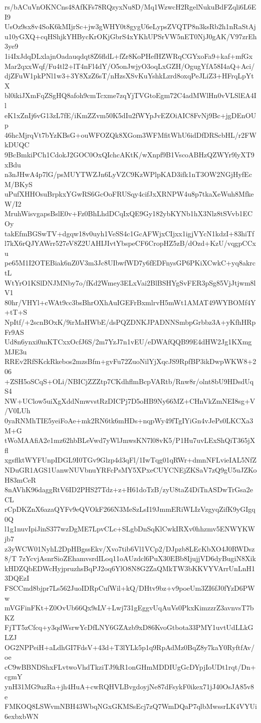 rs/bACuVnOKNCns48AfKFs78RQzyxNu8D/Mq1WzwcH2RgelNukuBdFZqli6L6EI9
UsOz9sx8v4SoK6kMIjrSc+jw3gWHY0t8gygU6eLypsZVQTP8n3ksRb2h1nRaStAj
u10yGXQ+cqHShjkYHBycKrOKjGbrS4xYKhUPSrVW5nET0NjJ0gAK/V97zrEh3ye9
1i4IxJdqDLxlajnOadauqdqt8Z6fldL+fZr8KoPHefHZWRqCGYxoFa9+kaf+mfGx
Mar2qxxWqf/Fu4tl2+lT4nFl4dY/O5onJwjyO3oqLxGZH/OgugYfA58I4aQ+Aci/
djZFuW1pkPNl1w3+3Y8XzZ6sT/nHzsXSvKuYshkLzrd8oxqPeJLiZ3+HFrqLpYtX
bl0ikiJXmFqZSgHQ8afoh9cmTcxme7zqYjTVGtoEgm72C4adMWlHn0vVLSlEA4Il
eK1xZnIj6vG13zL7fE/iKmZZvm50K5dIu2fWYpJvEZOiAIC8FvNj9Bc+jgDEnOUp
46hcMjrqVt7bYzKBsG+ouWFOZQk8XGom3WFMfitWhU6idDfDRScbHL/r2FWkDUQC
9BcBmkiPCh1CdokJ2GOC0OxQIchcAKtK/wXnpf9B1VscoABHzQZWYr9lyXT9xBdu
n3nJHwA4p7lG/psMUYTWZJn6LyVZC9KzWPlpKAD3ifk1nT3OW2NGjHyfEcM/BKyS
uPufXHHOsuBrpkxYGwRS6GcOoFRUSqy4cifJxXRNPW4u8p7tkaXeWuh8MfkeW/I2
MruhWisvgapsBslE0v+Fz0BhLhdDCqIxQE9Gy182ybKYNb1hX3Nlz8tSVvb1ECOy
takEfmBGSwTV+dgqw18v0uyh1VeSS4c1GcAFWjxCIjxx1igjVYcN1kdzI+83hiTf
l7kX6rQJYAWrr527eV8Z2UAHIJIvtYbspeCF6CropHZ5zB/dOzd+KzU/vqgpCCxu
pe65M1I2OTEBiak6nZ0V3m3Jc8UIbwfWD7y6fEDFnysGP6PKiXCwkC+yq8akrctL
WtYrO1KSlDNJMNby7o/fKd2Wmey3ELxVai2BlBSHYgSvFER3pSg85VjJtjwm8lV1
80hr/VHYl+cWAt9cc3bsBhrOXhAuIGEFrBxmlrvH5mWt1AMAT49WYBOMf4Y+tT+S
NpItf/+2scnBOxK/9irMaHWbE/dsPQZDNKJPADNNSmbpGrbbz3A+yKfhHRpFr9AS
Ud8n6ynxi0mKTCxxOcfJ6S/2m7YzJ7n1vEU/eDWAfQQB99E4dHW2Jg1KXmgMJE3u
RREv2RfSKckRkebos2mzsBfm+gvFu72ZuoNilYjXqcJS9RpfBP3ikDwpWKW8+206
+ZSH5oSCqS+OLi/NBICjZZZtp7CKdhflmBcpVARtb/Rnw8r/olnt8bU9HDsdUqS4
NW+UClow5uiXgXddNmwvstRzDICPj7D5oHB9Ny66MZ+CHnVkZmNEI8sg+V/V0LUh
0yaRNMhTIE5yeiFoAe+mk2RN6tk6mHDs+nqpWy49fTgIYiGn4vJePs0LKCXa3M+G
tWoMAAfiA2e1mz62hbBLeVwd7yWlJmwsKN7l08vK5/P1Hu7uvLExShQiT365jXfl
xgsflktWYFUnpIDGL9I0TGv9Glzp4d3qFl/1IwTqg01qRWr+dmnNFLvieIAL5NfZ
NDuGR1AGS1UanwNUVbnuYRFcPsMY5XPxeCUYCNEjZKSaV7zQ9gU5uJZKoH83mCeR
8nAVhK96daggRtV6ID2PHS27Tdz+z+H61doTzB/zyU8taZ4DiTnASDwTrGsa2eCL
rCpDKZnX6azaQYFv9eQVOkF266N3MeSzLsI19JmmERiWLIzVzgyqZifK9yGIgq0Q
l1g1nuvIpiJinS377wzDgME7LpvCLc+SLgbDnSqKlCwkIRXv0hhzmv5ENWYKWjb7
z3yWCW01NyhL2DpHBgssEkv/Xvo7tib6Vl1VCp2/DJpzb8LEcKbXO4J0RWDsz8/T
7zYcvjAsnrSioZEhamvsrdILoq11oAUzdcl6PuX30EBb8IjujjVD6dyBugiN8Xik
kHDZQbEDWcHyjpruzhsBqPJ2oq6YlO8N8G2ZaQMkTW3bKKVYVArrUnLnH13DQEzI
FSCCmd8bjpr7Ls562JuoIDRpCufWil+kQ/DHtv9bz+v9poeUm3ZI6fJ0fYzD6PWw
mVGFinFKt+Z0OvUb66Qx9sLV+Lwj731gEggvUqAuVs0PkxKimzzrZ3avnvsT7bKZ
FjTT5zCfcq+y3qdWsrwYcDfLNY6GZAzb9xD86KvoGtbota33PMY1uvtUdLLkGLZJ
OG2NPPeiH+aLdhGI7FdsV+43d+T3lYLk5p1q9RpAdMz0BqZ8y7kaY0RyftfAv/oe
cC9wBBNDShxFLvtwoVhdTkziTJ9kR1onGHmMDDIUgGcDYpjIoUDt1rqt/Dn+cgmY
ynH31MG9uzRa+jh4HuA+cwRQHVLBvgdoyjNe87dFsykF0ikex71jJ40OsJA85v8e
FMKOQ8LSWvmNBH43WbqNGxGKMSsEcj7zQ7WmDQaP7qlbMwssrLK4VYUi6exbxbWN
